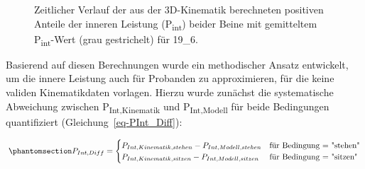 \documentclass[
  letterpaper,
  DIV=11]{scrartcl}
\begin{document}
\begin{figure}


\caption{\label{fig-PInt_Kinematik_19_6}Zeitlicher Verlauf der aus der
3D-Kinematik berechneten positiven Anteile der inneren Leistung
(P\textsubscript{int}) beider Beine mit gemitteltem
P\textsubscript{int}-Wert (grau gestrichelt) für 19\_6.}

\end{figure}%

Basierend auf diesen Berechnungen wurde ein methodischer Ansatz
entwickelt, um die innere Leistung auch für Probanden zu approximieren,
für die keine validen Kinematikdaten vorlagen. Hierzu wurde zunächst die
systematische Abweichung zwischen P\textsubscript{Int,Kinematik} und
P\textsubscript{Int,Modell} für beide Bedingungen quantifiziert
(Gleichung~\ref{eq-PInt_Diff}):

\begin{equation}\phantomsection\label{eq-PInt_Diff}{
P_{Int,Diff} = 
\begin{cases} 
P_{Int,Kinematik,stehen} - P_{Int,Modell,stehen} & \text{für Bedingung = "stehen"} \\
P_{Int,Kinematik,sitzen} - P_{Int,Modell,sitzen} & \text{für Bedingung = "sitzen"}
\end{cases}
}\end{equation}
\end{document}
